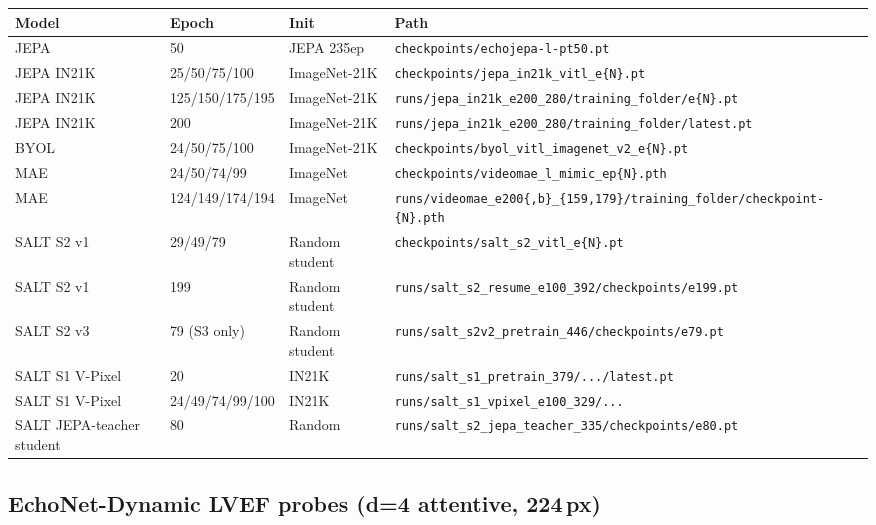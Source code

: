 \documentclass{article}
\begin{document}
\begin{center}
\begin{tabular}{llll}
\toprule
Model & Epoch & Init & Path \\
\midrule
JEPA & 50 & JEPA 235ep & \texttt{checkpoints/echojepa-l-pt50.pt} \\
JEPA IN21K & 25/50/75/100 & ImageNet-21K & \texttt{checkpoints/jepa\_in21k\_vitl\_e\{N\}.pt} \\
JEPA IN21K & 125/150/175/195 & ImageNet-21K & \texttt{runs/jepa\_in21k\_e200\_280/training\_folder/e\{N\}.pt} \\
JEPA IN21K & 200 & ImageNet-21K & \texttt{runs/jepa\_in21k\_e200\_280/training\_folder/latest.pt} \\
BYOL & 24/50/75/100 & ImageNet-21K & \texttt{checkpoints/byol\_vitl\_imagenet\_v2\_e\{N\}.pt} \\
MAE & 24/50/74/99 & ImageNet & \texttt{checkpoints/videomae\_l\_mimic\_ep\{N\}.pth} \\
MAE & 124/149/174/194 & ImageNet & \texttt{runs/videomae\_e200\{,b\}\_\{159,179\}/training\_folder/checkpoint-\{N\}.pth} \\
SALT S2 v1 & 29/49/79 & Random student & \texttt{checkpoints/salt\_s2\_vitl\_e\{N\}.pt} \\
SALT S2 v1 & 199 & Random student & \texttt{runs/salt\_s2\_resume\_e100\_392/checkpoints/e199.pt} \\
SALT S2 v3 & 79 (S3 only) & Random student & \texttt{runs/salt\_s2v2\_pretrain\_446/checkpoints/e79.pt} \\
SALT S1 V-Pixel & 20 & IN21K & \texttt{runs/salt\_s1\_pretrain\_379/.../latest.pt} \\
SALT S1 V-Pixel & 24/49/74/99/100 & IN21K & \texttt{runs/salt\_s1\_vpixel\_e100\_329/...} \\
SALT JEPA-teacher student & 80 & Random & \texttt{runs/salt\_s2\_jepa\_teacher\_335/checkpoints/e80.pt} \\
\bottomrule
\end{tabular}
\end{center}

\subsection{EchoNet-Dynamic LVEF probes (d=4 attentive, 224\,px)}
\end{document}
